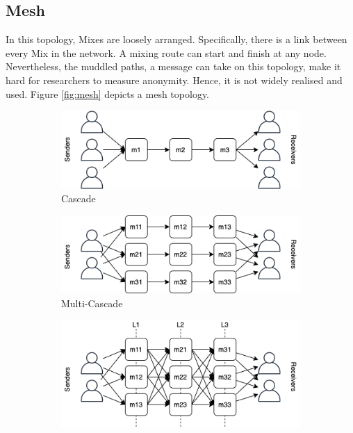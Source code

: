 \documentclass[logo,msc,cyber]{infthesis}   %
\begin{document}
\subsection{Mesh}
In this topology, Mixes are loosely arranged. Specifically, there is a link
between every Mix in the network. A mixing route can start and finish at any
node. Nevertheless, the muddled paths, a message can take on this topology, make
it hard for researchers to measure anonymity. Hence, it is not widely realised
and used. Figure \ref{fig:mesh} depicts a mesh topology.

\begin{figure}[h!]
    \centering
    \begin{subfigure}[b]{0.45\textwidth}
        \centering
        \includegraphics[width=\textwidth]{figures/topologies/cascade.png}
        \caption{Cascade}
        \label{fig:cascade}
    \end{subfigure}
    \hfill
    \begin{subfigure}[b]{0.45\textwidth}
        \centering
        \includegraphics[width=\textwidth]{figures/topologies/multi-cascade.png}
        \caption{Multi-Cascade}
        \label{fig:multi-cascade}
    \end{subfigure}
    \hfill
    \begin{subfigure}[b]{0.45\textwidth}
        \centering
        \includegraphics[width=\textwidth]{figures/topologies/stratified.png}

\end{subfigure}
\end{figure}
\end{document}
